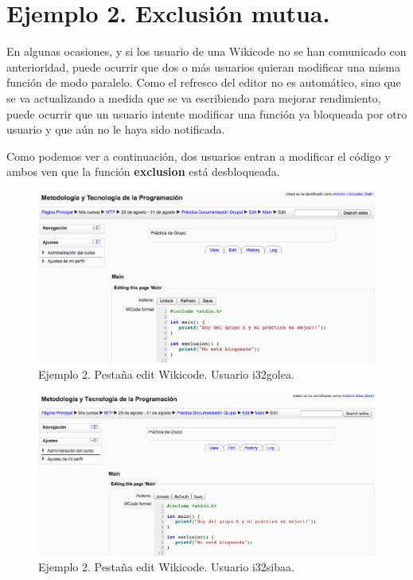 \newpage

\section{Ejemplo 2. Exclusión mutua.}

\let\thefootnote\relax{}

En algunas ocasiones, y si los usuario de una Wikicode no se han comunicado con anterioridad, puede ocurrir que dos o más usuarios quieran modificar una misma función de modo paralelo. Como el refresco del editor no es automático, sino que se va actualizando a medida que se va escribiendo para mejorar rendimiento, puede ocurrir que un usuario intente modificar una función ya bloqueada por otro usuario y que aún no le haya sido notificada.

Como podemos ver a continuación, dos usuarios entran a modificar el código y ambos ven que la función \textbf{exclusion} está desbloqueada.

\begin{center}

\begin{figure}[h]
	\label{fig:ej1edit2}
	\includegraphics[scale=0.40]{./img/ej2edit2.eps}
	\caption{Ejemplo 2. Pestaña edit Wikicode. Usuario i32golea.}
\end{figure}

\begin{figure}[h]
	\label{fig:ej1edit1}
	\includegraphics[scale=0.40]{./img/ej2edit1.eps}
	\caption{Ejemplo 2. Pestaña edit Wikicode. Usuario i32sibaa.}
\end{figure}

\end{center}

